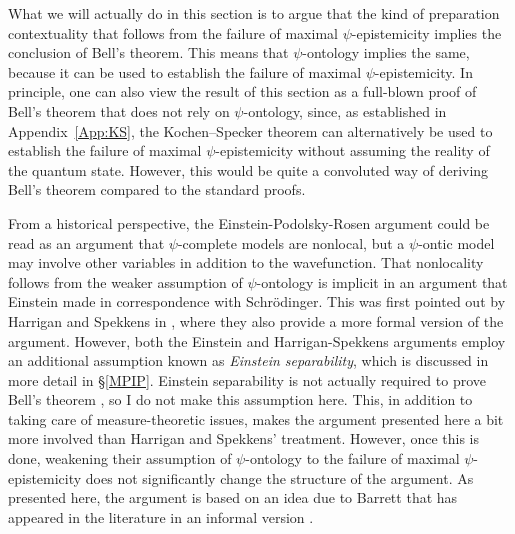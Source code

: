 \documentclass[DIV=calc,fontsize=12pt]{scrartcl} %
\theoremstyle{definition}
\theoremstyle{plain}
\begin{document}
What we will actually do in this section is to argue that the kind of
preparation contextuality that follows from the failure of maximal
$\psi$-epistemicity implies the conclusion of Bell's theorem.  This
means that $\psi$-ontology implies the same, because it can be used to
establish the failure of maximal $\psi$-epistemicity.  In principle,
one can also view the result of this section as a full-blown proof of
Bell's theorem that does not rely on $\psi$-ontology, since, as
established in Appendix~\ref{App:KS}, the Kochen--Specker theorem can
alternatively be used to establish the failure of maximal
$\psi$-epistemicity without assuming the reality of the quantum state.
However, this would be quite a convoluted way of deriving Bell's
theorem compared to the standard proofs.

From a historical perspective, the Einstein-Podolsky-Rosen argument
\cite{Einstein1935} could be read as an argument that $\psi$-complete
models are nonlocal, but a $\psi$-ontic model may involve other
variables in addition to the wavefunction.  That nonlocality follows
from the weaker assumption of $\psi$-ontology is implicit in an
argument that Einstein made in correspondence with Schr{\"o}dinger.
This was first pointed out by Harrigan and Spekkens in
\cite{Harrigan2010}, where they also provide a more formal version of
the argument.  However, both the Einstein and Harrigan-Spekkens
arguments employ an additional assumption known as \emph{Einstein
separability}, which is discussed in more detail in \S\ref{MPIP}.
Einstein separability is not actually required to prove Bell's theorem
\cite{Henson2013}, so I do not make this assumption here.  This, in
addition to taking care of measure-theoretic issues, makes the
argument presented here a bit more involved than Harrigan and
Spekkens' treatment.  However, once this is done, weakening their
assumption of $\psi$-ontology to the failure of maximal
$\psi$-epistemicity does not significantly change the structure of the
argument.  As presented here, the argument is based on an idea due to
Barrett \cite{Barrett2004} that has appeared in the literature in an
informal version \cite{Leifer2013c}.
\end{document}
